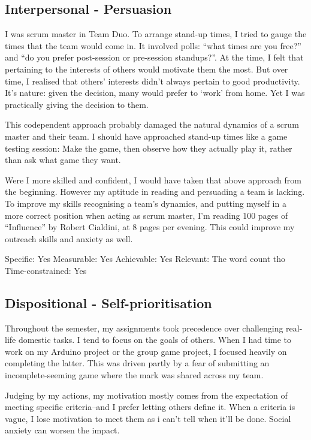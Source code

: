 \documentclass{scrartcl}
\begin{document}
\subsection{Interpersonal - Persuasion} %
I was scrum master in Team Duo. To arrange stand-up times, I tried to gauge the times that the team would come in. It involved polls: ``what times are you free?'' and ``do you prefer post-session or pre-session standups?''. At the time, I felt that pertaining to the interests of others would motivate them the most. But over time, I realised that others' interests didn't always pertain to good productivity. It's nature: given the decision, many would prefer to `work' from home. Yet I was practically giving the decision to them.

This codependent approach probably damaged the natural dynamics of a scrum master and their team. I should have approached stand-up times like a game testing session: Make the game, then observe how they actually play it, rather than ask what game they want.

Were I more skilled and confident, I would have taken that above approach from the beginning. However my aptitude in reading and persuading a team is lacking. To improve my skills recognising a team's dynamics, and putting myself in a more correct position when acting as scrum master, I'm reading 100 pages of ``Influence'' by Robert Cialdini, at 8 pages per evening. This could improve my outreach skills and anxiety as well.

Specific: Yes
Measurable: Yes
Achievable: Yes
Relevant: The word count tho
Time-constrained: Yes

\subsection{Dispositional - Self-prioritisation} %
Throughout the semester, my assignments took precedence over challenging real-life domestic tasks. I tend to focus on the goals of others. When I had time to work on my Arduino project or the group game project, I focused heavily on completing the latter. This was driven partly by a fear of submitting an incomplete-seeming game where the mark was shared across my team.

Judging by my actions, my motivation mostly comes from the expectation of meeting specific criteria--and I prefer letting others define it. When a criteria is vague, I lose motivation to meet them as i can't tell when it'll be done. Social anxiety can worsen the impact. 
\end{document}
